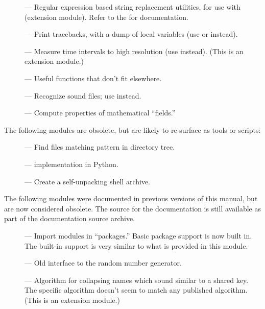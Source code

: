 \begin{description}
\item[]
--- Regular expression based string replacement utilities, for use
with  (extension module).  Refer to the
 for documentation.

\item[]
--- Print tracebacks, with a dump of local variables (use
 or  instead).

\item[]
--- Measure time intervals to high resolution (use
 instead).  (This is an extension module.)

\item[]
--- Useful functions that don't fit elsewhere.

\item[]
--- Recognize sound files; use  instead.

\item[]
--- Compute properties of mathematical ``fields.''
\end{description}


The following modules are obsolete, but are likely to re-surface as
tools or scripts:

\begin{description}
\item[]
--- Find files matching pattern in directory tree.

\item[]
---  implementation in Python.

\item[]
--- Create a self-unpacking \UNIX{} shell archive.
\end{description}


The following modules were documented in previous versions of this
manual, but are now considered obsolete.  The source for the
documentation is still available as part of the documentation source
archive.

\begin{description}
\item[]
--- Import modules in ``packages.''  Basic package support is now
built in.  The built-in support is very similar to what is provided in
this module.

\item[]
--- Old interface to the random number generator.

\item[]
--- Algorithm for collapsing names which sound similar to a shared
key.  The specific algorithm doesn't seem to match any published
algorithm.  (This is an extension module.)
\end{description}


